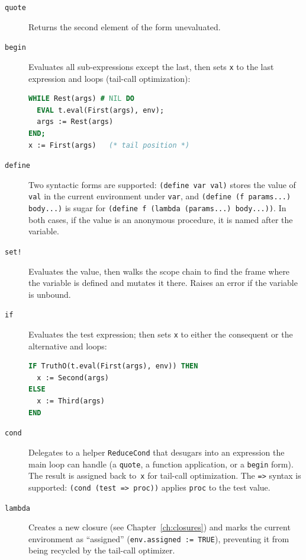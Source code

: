 \documentclass[12pt]{report}
\begin{document}
\begin{description}
\item[\texttt{quote}] Returns the second element of the form unevaluated.

\item[\texttt{begin}] Evaluates all sub-expressions except the last,
  then sets \texttt{x} to the last expression and loops (tail-call
  optimization):
\begin{lstlisting}[language=Modula3]
WHILE Rest(args) # NIL DO
  EVAL t.eval(First(args), env);
  args := Rest(args)
END;
x := First(args)   (* tail position *)
\end{lstlisting}

\item[\texttt{define}] Two syntactic forms are supported:
  \texttt{(define var val)} stores the value of \texttt{val} in the
  current environment under \texttt{var}, and
  \texttt{(define (f params...) body...)} is sugar for
  \texttt{(define f (lambda (params...) body...))}.  In both cases,
  if the value is an anonymous procedure, it is named after the
  variable.

\item[\texttt{set!}] Evaluates the value, then walks the scope chain
  to find the frame where the variable is defined and mutates it there.
  Raises an error if the variable is unbound.

\item[\texttt{if}] Evaluates the test expression; then sets \texttt{x}
  to either the consequent or the alternative and loops:
\begin{lstlisting}[language=Modula3]
IF TruthO(t.eval(First(args), env)) THEN
  x := Second(args)
ELSE
  x := Third(args)
END
\end{lstlisting}

\item[\texttt{cond}] Delegates to a helper \texttt{ReduceCond} that
  desugars into an expression the main loop can handle (a \texttt{quote},
  a function application, or a \texttt{begin} form).  The result is
  assigned back to~\texttt{x} for tail-call optimization.  The
  \texttt{=>} syntax is supported: \texttt{(cond (test => proc))}
  applies \texttt{proc} to the test value.

\item[\texttt{lambda}] Creates a new closure (see
  Chapter~\ref{ch:closures}) and marks the current environment as
  ``assigned'' (\texttt{env.assigned := TRUE}), preventing it from
  being recycled by the tail-call optimizer.


\end{description}
\end{document}
